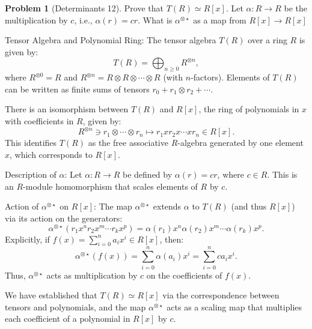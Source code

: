 \documentclass[12pt]{article}
\theoremstyle{definition}
\newtheorem{problem}{Problem}
\begin{document}
\begin{problem}[Determinants 12]
    Prove that $T(R) \simeq R[x]$. Let $\alpha : R \longrightarrow R$ be the multiplication by 
    $c$, i.e., $\alpha(r) = cr$. What is $\alpha^{\otimes\star}$ as a map from $R[x] \longrightarrow R[x]$

    \begin{solution}
        Tensor Algebra and Polynomial Ring:  
        The tensor algebra \( T(R) \) over a ring \( R \) is given by:
        \[
        T(R) = \bigoplus_{n \geq 0} R^{\otimes n},
        \]
        where \( R^{\otimes 0} = R \) and \( R^{\otimes n} = R \otimes R \otimes \cdots \otimes R \) (with \( n \)-factors). Elements of \( T(R) \) can be written as finite sums of tensors \( r_0 + r_1 \otimes r_2 + \cdots \).

        There is an isomorphism between \( T(R) \) and \( R[x] \), the ring of polynomials in \( x \) with coefficients in \( R \), given by:
        \[
        R^{\otimes n} \ni r_1 \otimes \cdots \otimes r_n \mapsto r_1 x r_2 x \cdots x r_n \in R[x].
        \]
        This identifies \( T(R) \) as the free associative \( R \)-algebra generated by one element \( x \), which corresponds to \( R[x] \).

        Description of \( \alpha \):  
        Let \( \alpha : R \to R \) be defined by \( \alpha(r) = cr \), where \( c \in R \). This is an \( R \)-module homomorphism that scales elements of \( R \) by \( c \).

        Action of \( \alpha^{\otimes \star} \) on \( R[x] \):  
        The map \( \alpha^{\otimes \star} \) extends \( \alpha \) to \( T(R) \) (and thus \( R[x] \)) via its action on the generators:
        \[
        \alpha^{\otimes \star}(r_1 x^n r_2 x^m \cdots r_k x^p) = \alpha(r_1) x^n \alpha(r_2) x^m \cdots \alpha(r_k) x^p.
        \]
        Explicitly, if \( f(x) = \sum_{i=0}^n a_i x^i \in R[x] \), then:
        \[
        \alpha^{\otimes \star}(f(x)) = \sum_{i=0}^n \alpha(a_i) x^i = \sum_{i=0}^n c a_i x^i.
        \]
        Thus, \( \alpha^{\otimes \star} \) acts as multiplication by \( c \) on the coefficients of \( f(x) \).

        We have established that \( T(R) \simeq R[x] \) via the correspondence between tensors and polynomials, and the map \( \alpha^{\otimes \star} \) acts as a scaling map that multiplies each coefficient of a polynomial in \( R[x] \) by \( c \).
    \end{solution}
\end{problem}
\end{document}
